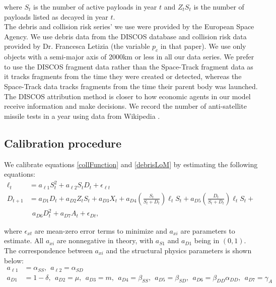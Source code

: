 \documentclass[12pt]{article}
\begin{document}
where $S_t$ is the number of active payloads in year $t$ and $Z_tS_t$ is the number of payloads listed as decayed in year $t$. \\

The debris and collision risk series' we use were provided by the European Space Agency. We use debris data from the DISCOS database \citep{FRAGdata} and collision risk data provided by Dr. Francesca Letizia \citep{ECOBdata} (the variable $p_c$ in that paper). We use only objects with a semi-major axis of 2000km or less in all our data series. We prefer to use the DISCOS fragment data rather than the Space-Track fragment data as it tracks fragments from the time they were created or detected, whereas the Space-Track data tracks fragments from the time their parent body was launched. The DISCOS attribution method is closer to how economic agents in our model receive information and make decisions. We record the number of anti-satellite missile tests in a year using data from Wikipedia \citep{ASATdata}.


\subsection{Calibration procedure}
We calibrate equations \ref{collFunction} and \ref{debrisLoM} by estimating the following equations:
\begin{align}
\label{riskEstimation}
\ell_t &= a_{\ell 1} S_t^2 + a_{\ell 2} S_t D_t + \epsilon_{\ell t}  \\
\label{debLoMEstimation}
D_{t+1} &= a_{D 1} D_t + a_{D 2}Z_tS_t + a_{D 3} X_t  + a_{D4} \left( \frac{S_t}{S_t+D_t} \right ) \ell_t S_t + a_{D5}\left( \frac{D_t}{S_t+D_t} \right ) \ell_t S_t + \\
&~~  a_{D6} D_t^2 + a_{D7}A_t + \epsilon_{D t},
\end{align}

where $\epsilon_{xt}$ are mean-zero error terms to minimize and $a_{xi}$ are parameters to estimate. All $a_{xi}$ are nonnegative in theory, with $a_{S1}$ and $a_{D1}$ being in $(0,1)$. The correspondence between $a_{xi}$ and the structural physics parameters is shown below:
\begin{align*}
a_{\ell 1} &= \alpha_{SS}, ~~ a_{\ell 2} = \alpha_{SD} \\
a_{D1} &= 1-\delta, ~~ a_{D 2} = \mu, ~~ a_{D 3} = m, ~~ a_{D4} = \beta_{SS}, ~~ a_{D5} = \beta_{SD}, ~~ a_{D6} = \beta_{DD}\alpha_{DD}, ~~ a_{D7} = \gamma_A
\end{align*}
\end{document}
